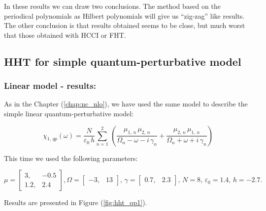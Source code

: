 \documentclass[12pt,twoside,a4paper]{article}
\numberwithin{equation}{subsection}
\numberwithin{figure}{subsection}
\begin{document}
In these results we can draw two conclusions. The method based on the periodical polynomials as Hilbert polynomials will give us ``zig-zag'' like results. The other conclusion is that results obtained seems to be close, but much worst that those obtained with HCCI or FHT. 

\subsection{HHT for simple quantum-perturbative model} \label{chap:hermite_quantum}

\subsubsection*{Linear model - results:}

As in the Chapter (\ref{chap:nc_nlo}), we have used the same model to describe the simple linear quantum-perturbative model: 

\begin{equation} \label{eq:hht_qp}
  {\chi_{1, \,qp}}(\omega ) = \frac {N}{\varepsilon_0\,h} \sum_{n=1}^{2}\,(\frac {{\mu_{1, \,n}}\,{ \mu_{2, \,n}}}{{\Omega_{n}}
  - \omega  - i\,{\gamma_{n}}} + \frac {{\mu_{2, \,n}}\,{\mu_{1, \,n}}}{{\Omega_{n}} + \omega + i\,{\gamma_{n}}})
\end{equation}

This time we used the following parameters: 

\begin{equation}
  \mu = \begin{bmatrix} 
    3,   & - 0.5 \\ 
    1.2, &   2.4
  \end{bmatrix},
  \Omega = \begin{bmatrix} 
    - 3, & 13
  \end{bmatrix}, \,
  \gamma = \begin{bmatrix} 
    0.7, & 2.3
  \end{bmatrix}, \,
  N = 8, \,
  \varepsilon_{0} = 1.4, \,
  h = - 2.7.
\end{equation} 

Results are presented in Figure (\ref{fig:hht_qp1}). 
\end{document}
